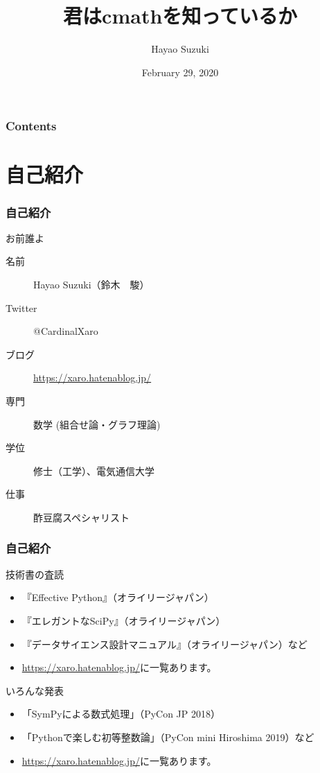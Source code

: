 \documentclass[dvipdfmx,11pt,notheorems]{beamer}
\title[All about cmath module]{君はcmathを知っているか}
\author[Hayao]{Hayao Suzuki}
\institute[Shizuoka 2020]{PyCon mini Shizuoka 2020}
\date{February 29, 2020}
\theoremstyle{definition}
\begin{document}
\begin{frame}[plain]\frametitle{}
\titlepage %
\end{frame}

\begin{frame}\frametitle{Contents}
\tableofcontents %
\end{frame}

\section{自己紹介}

\begin{frame}\frametitle{自己紹介}

\begin{block}{お前誰よ}
\begin{description}
\item[名前] Hayao Suzuki（鈴木　駿）
\item[Twitter] @CardinalXaro
\item[ブログ] \url{https://xaro.hatenablog.jp/}
\item[専門] 数学 (組合せ論・グラフ理論)
\item[学位] 修士（工学）、電気通信大学
\item[仕事] 酢豆腐スペシャリスト
\end{description}
\end{block}

\end{frame}

\begin{frame}\frametitle{自己紹介}

\begin{block}{技術書の査読}
\begin{itemize}
\item 『Effective Python』（オライリージャパン）
\item 『エレガントなSciPy』（オライリージャパン）
\item 『データサイエンス設計マニュアル』（オライリージャパン）など
\item \url{https://xaro.hatenablog.jp/}に一覧あります。
\end{itemize}
\end{block}

\begin{block}{いろんな発表}
\begin{itemize}
\item 「SymPyによる数式処理」（PyCon JP 2018）
\item 「Pythonで楽しむ初等整数論」（PyCon mini Hiroshima 2019）など
\item \url{https://xaro.hatenablog.jp/}に一覧あります。
\end{itemize}
\end{block}

\end{frame}
\end{document}
